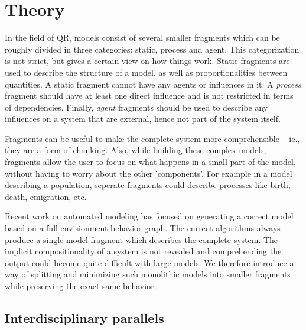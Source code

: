 \documentclass{article} %
\begin{document}
\section{Theory}

In the field of QR, models %
consist of several smaller fragments which can be roughly divided in three
categories: static, process and agent. This categorization is not strict, but
gives a certain view on how things work. Static fragments are used to describe
the structure of a model, as well as proportionalities between quantities. A
static fragment cannot have any agents or influences in it. A \emph{process}
fragment should have at least one direct influence and is not restricted in
terms of dependencies. %
Finally, \emph{agent} fragments should be used to describe any influences on a
system that are external, hence not part of the system itself.

Fragments can be useful to make the complete system more comprehensible --
ie., they are a form of chunking.  Also, while building these complex models,
fragments allow the user to focus on what happens in a small part of the
model, without having to worry about the other 'components'. For example in a
model describing a population, seperate fragments could describe processes
like birth, death, emigration, etc.

Recent work on automated modeling \cite{buisman, liem, vanweelden} has focused
on generating a correct model based on a full-envisionment behavior graph. The
current algorithms always produce a single model fragment which describes the
complete system. The implicit compositionality of a system is not revealed and
comprehending the output could become quite difficult with large models. We
therefore introduce a way of splitting and minimizing such monolithic models
into smaller fragments while preserving the exact same behavior.

\subsection{Interdisciplinary parallels}
\end{document}
